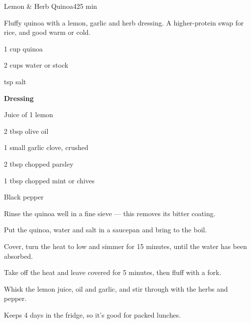 \begin{recipebox}{Lemon \& Herb Quinoa}{4}{25 min}

Fluffy quinoa with a lemon, garlic and herb dressing. A higher-protein swap
for rice, and good warm or cold.

\begin{ingredients}
  \item 1 cup quinoa
  \item 2 cups water or stock
  \item {} tsp salt
  \item[] \textbf{Dressing}
  \item Juice of 1 lemon
  \item 2 tbsp olive oil
  \item 1 small garlic clove, crushed
  \item 2 tbsp chopped parsley
  \item 1 tbsp chopped mint or chives
  \item Black pepper
\end{ingredients}

\begin{method}
  \item Rinse the quinoa well in a fine sieve --- this removes its bitter coating.
  \item Put the quinoa, water and salt in a saucepan and bring to the boil.
  \item Cover, turn the heat to low and simmer for 15 minutes, until the water has been absorbed.
  \item Take off the heat and leave covered for 5 minutes, then fluff with a fork.
  \item Whisk the lemon juice, oil and garlic, and stir through with the herbs and pepper.
\end{method}

\begin{notelist}
  \item Keeps 4 days in the fridge, so it's good for packed lunches.
\end{notelist}

\end{recipebox}
